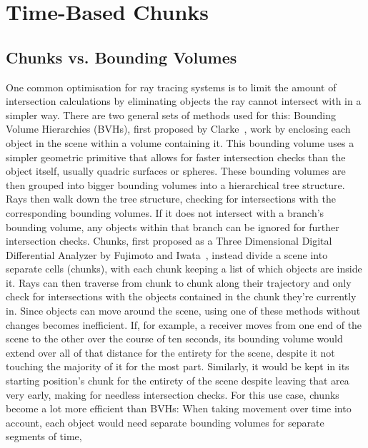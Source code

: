 \chapter{Time-Based Chunks}

\section{Chunks vs. Bounding Volumes}

One common optimisation for ray tracing systems is to limit the amount of intersection calculations by eliminating
objects the ray cannot intersect with in a simpler way.
There are two general sets of methods used for this:
\newline
Bounding Volume Hierarchies (BVHs), first proposed by Clarke~\cite{Cl76},
work by enclosing each object in the scene within a volume containing it.
This bounding volume uses a simpler geometric primitive that allows for faster intersection checks than the object itself,
usually quadric surfaces or spheres.
These bounding volumes are then grouped into bigger bounding volumes into a hierarchical tree structure.
Rays then walk down the tree structure, checking for intersections with the corresponding bounding volumes.
If it does not intersect with a branch's bounding volume,
any objects within that branch can be ignored for further intersection checks.
\newline
Chunks, first proposed as a Three Dimensional Digital Differential Analyzer by Fujimoto and Iwata~\cite{FI85},
instead divide a scene into separate cells (chunks),
with each chunk keeping a list of which objects are inside it.
Rays can then traverse from chunk to chunk along their trajectory
and only check for intersections with the objects contained in the chunk they're currently in.
\newline
Since objects can move around the scene, using one of these methods without changes becomes inefficient.
If, for example, a receiver moves from one end of the scene to the other over the course of ten seconds,
its bounding volume would extend over all of that distance for the entirety for the scene, despite it not touching
the majority of it for the most part. Similarly, it would be kept in its starting position's chunk for the entirety
of the scene despite leaving that area very early, making for needless intersection checks.
\newline
For this use case, chunks become a lot more efficient than BVHs:
When taking movement over time into account, each object would need separate bounding volumes for separate segments of time,
